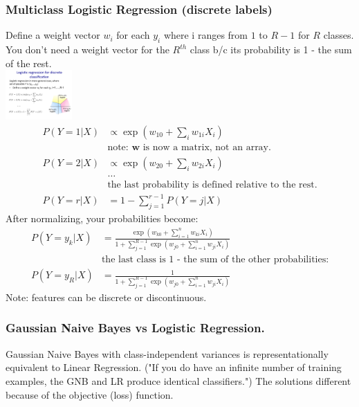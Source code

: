 \subsubsection{Multiclass Logistic Regression (discrete labels)}
Define a weight vector $w_i$ for each $y_i$ where i ranges from $1$ to $R-1$ for $R$ classes.
You don't need a weight vector for the $R^{th}$ class b/c its probability is 1 - the sum of the rest.  \hfill \\
\includegraphics[width=1in]{figures/multiclass_logistic.pdf} \hfill \\
\begin {align*}
	P(Y=1 | X ) & \propto \exp(w_{10} + \sum_i w_{1i}X_i)  \\
		& \mbox{note: $\bm{w}$ is now a matrix, not an array.}  \\
	P(Y=2 | X ) & \propto \exp(w_{20} + \sum_i w_{2i}X_i)  \\
	 & \dots \\
	 & \mbox{the last probability is defined relative to the rest.}  \\
	P(Y=r | X ) &= 1- \sum_{j=1}^{r-1} P(Y=j | X)
\end{align*}
After normalizing, your probabilities become: 
\begin {align*}
	P(Y=y_k | X ) &=  \frac{\exp(w_{k0} + \sum_{i=1}^n w_{ki} X_i)}{1 + \sum_{j=1}^{R-1} \exp(w_{j0} + \sum_{i=1}^n w_{ji}X_i)} \\
	& \mbox{the last class is 1 - the sum of the other probabilities:} \\
	P(Y=y_R | X ) &=  \frac{1}{1 + \sum_{j=1}^{R-1} \exp(w_{j0} + \sum_{i=1}^n w_{ji}X_i)} 
\end{align*}
Note: features can be discrete or discontinuous. 

\subsubsection{Gaussian Naive Bayes vs Logistic Regression.}
Gaussian Naive Bayes with class-independent variances is representationally equivalent to Linear Regression.
("If you do have an infinite number of training examples, the GNB and LR produce identical classifiers.")  %
The solutions different because of the objective (loss) function.  \hfill \\

